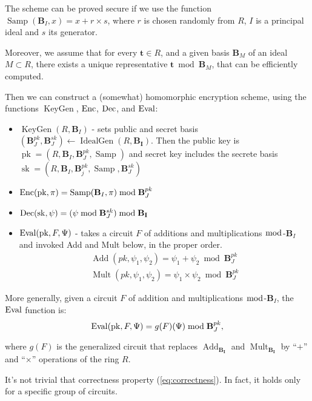 The scheme can be proved secure if we use the function $\operatorname{Samp}(\mathbf B_I,x)=x+r\times s$, where $r$ is chosen randomly from $R$, $I$ is a principal ideal and $s$ its generator.

Moreover, we assume that for every $\mathbf t \in R$, and a given basis $\mathbf B_M$ of an ideal $M\subset R$, there exists a unique representative $\mathbf t \bmod {\mathbf B_M}$, that can be efficiently computed.

Then we can construct a (somewhat) homomorphic encryption scheme, using the functions $\operatorname{KeyGen}$, $\operatorname{Enc}$, $\operatorname{Dec}$, and $\operatorname{Eval}$:
\begin{itemize}
    \item $\operatorname{KeyGen}(R,\mathbf B_I)$ - sets public and secret basis $(\mathbf B_{J}^{pk},\mathbf B_{J}^{sk})\leftarrow \operatorname{IdealGen}(R,\mathbf{B_I})$. Then the public key is $\operatorname{pk}=(R,\mathbf B_I,\mathbf B_J^{pk},\operatorname{Samp})$ and secret key includes the secrete basis $\operatorname{sk}=(R,\mathbf B_I,\mathbf B_j^{pk},\operatorname{Samp},\mathbf B_J^{sk})$
    \item $\operatorname{Enc}(\operatorname{pk},\pi)=\operatorname{Samp}(\mathbf B_I,\pi)\bmod \mathbf B_J^{pk}$
    
    \item $\operatorname{Dec}(\operatorname{sk},\psi) = (\psi \bmod \mathbf B_J^{sk})\bmod \mathbf{B_I}$
    
    \item $\operatorname{Eval}(\operatorname{pk},F,\Psi)$ - takes a circuit $F$ of additions and multiplications $\bmod$-$ \mathbf B_I$ and invoked Add and Mult below, in the proper order.
    \begin{align*}
        \operatorname{Add}(pk,\psi_1,\psi_2)=\psi_1+\psi_2\bmod\mathbf B_J^{pk}\\
        \operatorname{Mult}(pk,\psi_1,\psi_2)=\psi_1\times\psi_2\bmod\mathbf B_J^{pk}
    \end{align*}
\end{itemize}

More generally, given a circuit $F$ of addition and multiplications  $\bmod$-$ \mathbf B_I$, the $\operatorname{Eval}$ function is:
$$\operatorname{Eval}(\operatorname{pk},F,\Psi)=g(F)(\Psi)\bmod\mathbf B_J^{pk},$$

where $g(F)$ is the generalized circuit that replaces $\operatorname{Add}_{\mathbf{B_I}}$ and $\operatorname{Mult}_{\mathbf{B_I}}$ by ``$+$'' and ``$\times$'' operations of the ring $R$.

It's not trivial that correctness property (\ref{eq:correctness}). In fact, it holds only for a specific group of circuits.

